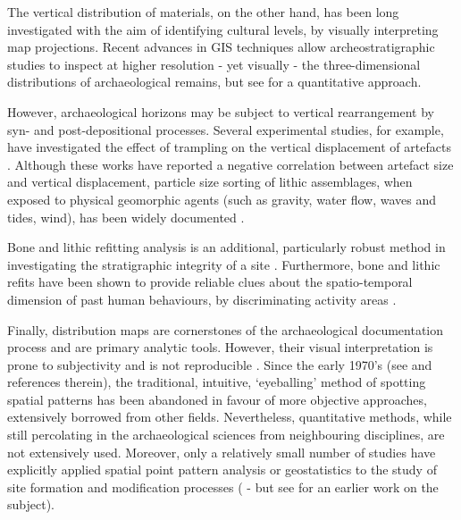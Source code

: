 \documentclass[review,authoryear,times]{elsarticle} %
\begin{document}
The vertical distribution of materials, on the other hand, has been long investigated with the aim of identifying cultural levels, by visually interpreting map projections. Recent advances in GIS techniques allow archeostratigraphic studies to inspect at higher resolution - yet visually - the three-dimensional distributions of archaeological remains, but see \cite{Anderson2008} for a quantitative approach.

However, archaeological horizons may be subject to vertical rearrangement by syn- and post-depositional processes. Several experimental studies, for example, have investigated the effect of trampling on the vertical displacement of artefacts \citep{Villa1983a,Gifford-Gonzalez1985,Nielsen1991,Eren2010}. Although these works have reported a negative correlation between artefact size and vertical displacement, particle size sorting of lithic assemblages, when exposed to physical geomorphic agents (such as gravity, water flow, waves and tides, wind), has been widely documented \citep{Rick1976,Schick1986,Petraglia1987,Morton2004,Lenoble2005,Bertran2012}. %

Bone and lithic refitting analysis is an additional, particularly robust method in investigating the stratigraphic integrity of a site \citep{Villa1982,Villa1990,Todd1992,Morin2005,Sisk2008}. Furthermore, bone and lithic refits have been shown to provide reliable clues about the spatio-temporal dimension of past human behaviours, by discriminating activity areas \citep{Lopez-Ortega2011,Lopez-Ortega2015,Vaquero2012,Vaquero2015,Clark2016,Gabucio2017}.

Finally, distribution maps are cornerstones of the archaeological documentation process and are primary analytic tools. However, their visual interpretation is prone to subjectivity and is not reproducible \citep{Bevan2013a}. Since the early 1970's (see \cite{Hodder1976,Orton1982} and references therein), the traditional, intuitive, `eyeballing' method of spotting spatial patterns has been abandoned in favour of more objective approaches, extensively borrowed from other fields. Nevertheless, quantitative methods, while still percolating in the archaeological sciences from neighbouring disciplines, are not extensively used. Moreover, only a relatively small number of studies have explicitly applied spatial point pattern analysis or geostatistics to the study of site formation and modification processes (\cite{Lenoble2008,Dominguez-Rodrigo2014b,Dominguez-Rodrigo2014c,Dominguez-Rodrigo2017,Carrer2015,Giusti2016,Organista2017} - but see \cite{Hivernel1984} for an earlier work on the subject).
\end{document}
